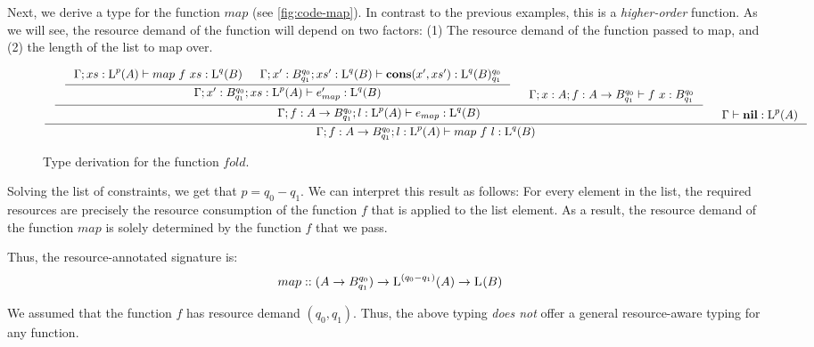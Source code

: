 \begin{example}
   Next, we derive a type for the function \(map\) (see \cref{fig:code-map}). In contrast to the previous examples, this is a \emph{higher-order} function. As we will see, the resource demand of the function will depend on two factors: (1) The resource demand of the function passed to map, and (2) the length of the list to map over.

   \begin{figure}[H]
      \[
         \inference
         {
            \inference
            {
               \inference
               {
                  \typing{\Gamma;xs:\ralist{p}{A}}{map~f~xs}{\ralist{q}{B}}
                  &
                  \typing{\Gamma;x':\ratype{B}{q_0}{q_1};xs':\ralist{q}{B}}{\cons{x'}{xs'}}{\ratype{\ralist{q}{B}}{q_0}{q_1}}
               }
               {
                  \typing{\Gamma;x':\ratype{B}{q_0}{q_1};xs:\ralist{p}{A}}{e_{map}'}{\ralist{q}{B}}
               }
               &
               \typing{\Gamma;x:A;f:\rafunc{A}{B}{q_0}{q_1}}{f~x}{\ratype{B}{q_0}{q_1}}
            }
            {
               \typing{\Gamma;f:\rafunc{A}{B}{q_0}{q_1};l:\ralist{p}{A}}{e_{map}}{\ralist{q}{B}}
            }
            &
            \typing{\Gamma}{\listnil}{\ralist{p}{A}}
         }
         {
            \typing{\Gamma;f:\rafunc{A}{B}{q_0}{q_1};l:\ralist{p}{A}}{map~f~l}{\ralist{q}{B}}
         }
      \]
   \caption{Type derivation for the function \(fold\).}
   \label{fig:derivation-fold}
   \end{figure}

Solving the list of constraints, we get that \(p = q_0 - q_1\). We can interpret this result as follows: For every element in the list, the required resources are precisely the resource consumption of the function \(f\) that is applied to the list element. As a result, the resource demand of the function \(map\) is solely determined by the function \(f\) that we pass.

Thus, the resource-annotated signature is:
\[
   map :: (A \to B ^{q_0}_{q_1}) \to \text{L}^{(q_0 - q_1)}(A) \to \text{L}^{}(B)
\]

\end{example}

\begin{remark}
   We assumed that the function \(f\) has resource demand \((q_0, q_1)\). Thus, the above typing \emph{does not} offer a general resource-aware typing for any function.
\end{remark}

